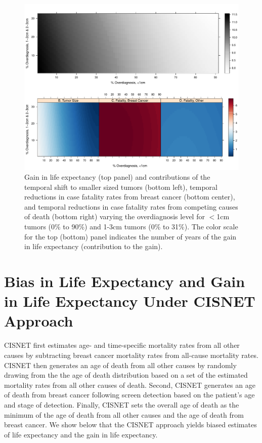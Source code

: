 \documentclass[11pt,letterpaper]{article}
\theoremstyle{plain}
\begin{document}
\begin{figure}[h]
\begin{center}
\includegraphics[scale=0.52]{appendix_figure2}
\caption{Gain in life expectancy (top panel) and
  contributions of the temporal shift to smaller sized tumors (bottom
  left), temporal reductions in case fatality rates from breast cancer
  (bottom center), and temporal reductions in case fatality rates from
  competing causes of death (bottom right) varying the overdiagnosis
  level for $<$1cm tumors (0\% to 90\%) and 1-3cm tumors (0\% to
  31\%).  The color scale for the top (bottom) panel indicates the
number of years of the gain in life expectancy (contribution to the gain).}
\label{fig:figure2}
\end{center}
\end{figure}

\newpage
\section{Bias in Life Expectancy and Gain in
  Life Expectancy Under CISNET Approach}
 CISNET first estimates age- and time-specific mortality
rates from all other causes by subtracting breast cancer mortality
rates from all-cause mortality rates.  CISNET then generates an age of
death from all other causes by randomly drawing from the the age of
death distribution based on a set of the estimated mortality rates
from all other causes of death.  Second, CISNET generates an age of
death from breast cancer following screen detection based on the
patient's age and stage of detection.  Finally, CISNET sets the
overall age of death as the minimum of the age of death from all other
causes and the age of death from breast cancer.  We show below that the
CISNET approach yields biased estimates of life expectancy and the
gain in life expectancy.
\end{document}
